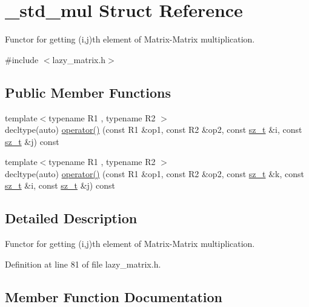 \hypertarget{struct__std__mul}{}\section{\+\_\+std\+\_\+mul Struct Reference}
\label{struct__std__mul}


Functor for getting (i,j)th element of Matrix-\/\+Matrix multiplication.  




{\ttfamily \#include $<$lazy\+\_\+matrix.\+h$>$}

\subsection*{Public Member Functions}
\begin{DoxyCompactItemize}
\item 
{\footnotesize template$<$typename R1 , typename R2 $>$ }\\decltype(auto) \mbox{\hyperlink{struct__std__mul_ac151a60a20f2c5fb6fb48abb24926ab3}{operator()}} (const R1 \&op1, const R2 \&op2, const \mbox{\hyperlink{lazy__matrix_8h_acba2745dcfc55b2d05ff45adc6a0a015}{sz\+\_\+t}} \&i, const \mbox{\hyperlink{lazy__matrix_8h_acba2745dcfc55b2d05ff45adc6a0a015}{sz\+\_\+t}} \&j) const
\item 
{\footnotesize template$<$typename R1 , typename R2 $>$ }\\decltype(auto) \mbox{\hyperlink{struct__std__mul_a7042dcb453b74c4e3fa1c70179c38043}{operator()}} (const R1 \&op1, const R2 \&op2, const \mbox{\hyperlink{lazy__matrix_8h_acba2745dcfc55b2d05ff45adc6a0a015}{sz\+\_\+t}} \&k, const \mbox{\hyperlink{lazy__matrix_8h_acba2745dcfc55b2d05ff45adc6a0a015}{sz\+\_\+t}} \&i, const \mbox{\hyperlink{lazy__matrix_8h_acba2745dcfc55b2d05ff45adc6a0a015}{sz\+\_\+t}} \&j) const
\end{DoxyCompactItemize}


\subsection{Detailed Description}
Functor for getting (i,j)th element of Matrix-\/\+Matrix multiplication. 

Definition at line 81 of file lazy\+\_\+matrix.\+h.



\subsection{Member Function Documentation}
\mbox{\label{struct__std__mul_ac151a60a20f2c5fb6fb48abb24926ab3}} 

